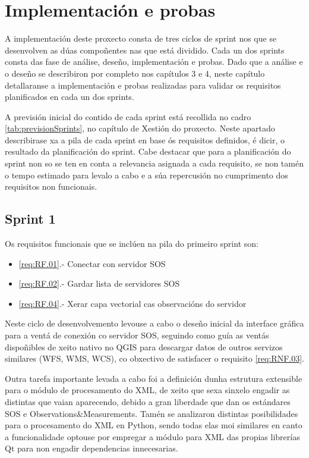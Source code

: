 \chapter{Implementación e probas}

A implementación deste proxecto consta de tres ciclos de sprint nos que se desenvolven as dúas compoñentes nas que está dividido. Cada un dos sprints consta das fase de análise, deseño, implementación e probas. Dado que a análise e o deseño se describiron por completo nos capítulos 3 e 4, neste capítulo detallaranse a implementación e probas realizadas para validar os requisitos planificados en cada un dos sprints.

A previsión inicial do contido de cada sprint está recollida no cadro \ref{tab:previsionSprints}, no capítulo de Xestión do proxecto. Neste apartado describirase xa a pila de cada sprint en base ós requisitos definidos, é dicir, o resultado da planificación do sprint. Cabe destacar que para a planificación do sprint non so se ten en conta a relevancia asignada a cada requisito, se non tamén o tempo estimado para levalo a cabo e a súa repercusión no cumprimento dos requisitos non funcionais.

\section{Sprint 1}
Os requisitos funcionais que se inclúen na pila do primeiro sprint son:
\begin{itemize}
\item \ref{req:RF.01}.- Conectar con servidor SOS
\item \ref{req:RF.02}.- Gardar lista de servidores SOS
\item \ref{req:RF.04}.- Xerar capa vectorial cas observacións do servidor
\end{itemize}

Neste ciclo de desenvolvemento levouse a cabo o deseño inicial da interface gráfica para a ventá de conexión co servidor SOS, seguindo como guía as ventás dispoñibles de xeito nativo no QGIS para descargar datos de outros servizos similares (WFS, WMS, WCS), co obxectivo de satisfacer o requisito \ref{req:RNF.03}.

Outra tarefa importante levada a cabo foi a definición dunha estrutura extensible para o módulo de procesamento do XML, de xeito que sexa sinxelo engadir as distintas que vaian aparecendo, debido a gran liberdade que dan os estándares SOS e Observations\&Measurements. Tamén se analizaron distintas posibilidades para o procesamento do XML en Python, sendo todas elas moi similares en canto a funcionalidade optouse por empregar a módulo para XML das propias librerías Qt para non engadir dependencias innecesarias.

